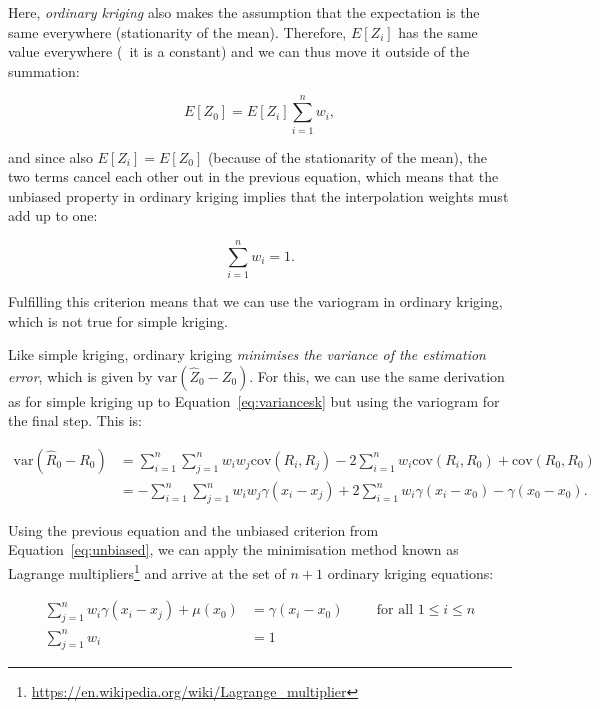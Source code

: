 Here, \emph{ordinary kriging} also makes the assumption that the expectation is the same everywhere (stationarity of the mean).
Therefore, \(E\left[Z_i\right]\) has the same value everywhere (\ie\ it is a constant) and we can thus move it outside of the summation:

\begin{equation}
E\left[ Z_0 \right] = E\left[Z_i\right] \sum_{i=1}^n w_i,
\end{equation}

and since also \(E\left[Z_i\right] = E\left[ Z_0 \right] \) (because of the stationarity of the mean), the two terms cancel each other out in the previous equation, which means that the unbiased property in ordinary kriging implies that the interpolation weights must add up to one:

\begin{equation}
\sum_{i=1}^n w_i = 1.
\end{equation}

Fulfilling this criterion means that we can use the variogram in ordinary kriging, which is not true for simple kriging.

Like simple kriging, ordinary kriging \emph{minimises the variance of the estimation error}, which is given by \(\mathrm{var}\left(\hat{Z}_0 - Z_0\right)\).
For this, we can use the same derivation as for simple kriging up to Equation~\ref{eq:variancesk} but using the variogram for the final step.
This is:

\begin{align}
\mathrm{var}\left(\hat{R}_0 - R_0\right) &= \sum_{i=1}^n \sum_{j=1}^n w_i w_j \mathrm{cov}(R_i, R_j) - 2\sum_{i=1}^n w_i \mathrm{cov}(R_i,R_0) + \mathrm{cov}(R_0, R_0) \nonumber \\
&= -\sum_{i=1}^n \sum_{j=1}^n w_i w_j \gamma(x_i-x_j) + 2\sum_{i=1}^n w_i \gamma(x_i-x_0) - \gamma(x_0-x_0).
\end{align}

Using the previous equation and the unbiased criterion from Equation~\ref{eq:unbiased}, we can apply the minimisation method known as Lagrange multipliers\footnote{\url{https://en.wikipedia.org/wiki/Lagrange_multiplier}} and arrive at the set of \(n+1\) ordinary kriging equations:

\begin{align}
\sum_{j=1}^n w_i \gamma(x_i-x_j) + \mu(x_0) &= \gamma(x_i - x_0) \hspace{1cm} \text{for all } 1 \leq i \leq n \nonumber \\
\sum_{j=1}^n w_i &= 1 
\end{align}

